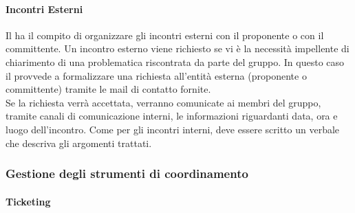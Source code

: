 \paragraph{Incontri Esterni}
Il \roleProjectManager{} ha il compito di organizzare gli incontri esterni con il proponente o con il committente. Un incontro esterno viene richiesto se vi è la necessità impellente di chiarimento di una problematica riscontrata da parte del gruppo. In questo caso il \roleProjectManager{} provvede a formalizzare una richiesta all'entità esterna (proponente o committente) tramite le mail di contatto fornite. \\Se la richiesta verrà accettata, verranno comunicate ai membri del gruppo, tramite canali di comunicazione interni, le informazioni riguardanti data, ora e luogo dell'incontro. Come per gli incontri interni, deve essere scritto un verbale che descriva gli argomenti trattati.

\subsubsection{Gestione degli strumenti di coordinamento}

\paragraph{Ticketing}\label{paragraph:ticketing}

